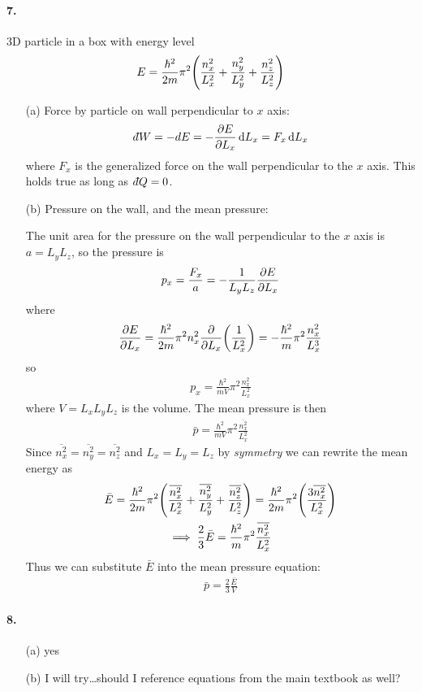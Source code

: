 \documentclass[../main.tex]{subfiles}
\begin{document}
\paragraph{7.} 3D particle in a box with energy level
\begin{align*}
    E = \frac{\hbar^2}{2m} \pi^2 \qt(\frac{n_x^2}{L_x^2} + \frac{n_y^2}{L_y^2} + \frac{n_z^2}{L_z^2})
\end{align*}
\begin{itemize}
    \item [(a)] Force by particle on wall perpendicular to $x$ axis:
    \begin{align*}
        d\hspace*{-0.08em}\bar{}\hspace*{0.1em} W = -dE = -\pdv{E}{L_x} \dd{L_x} = F_x \dd{L_x}
    \end{align*}
    where $F_x$ is the generalized force on the wall perpendicular to the $x$ axis. 
    This holds true as long as $d\hspace*{-0.08em}\bar{}\hspace*{0.1em} Q = 0$.
    \item [(b)] Pressure on the wall, and the mean pressure:
    
    The unit area for the pressure on the wall perpendicular to the $x$ axis is $a = L_y L_z$, so the pressure is
    \begin{align*}
        p_x = \frac{F_x}{a} = -\frac{1}{L_y L_z} \pdv{E}{L_x}
    \end{align*}
    where
    \begin{align*}
        \pdv{E}{L_x} = \frac{\hbar^2}{2m} \pi^2 n_x^2 \pdv{L_x}(\frac{1}{L_x^2}) = -\frac{\hbar^2}{m} \pi^2 \frac{n_x^2}{L_x^3}
    \end{align*}
    so 
    \begin{align*}
        p_x = \frac{\hbar^2}{mV} \pi^2 \frac{n_x^2}{L_x^2}
    \end{align*}
    where $V = L_x L_y L_z$ is the volume. The mean pressure is then 
    \begin{align*}
        \bar p = \frac{\hbar^2}{mV} \pi^2 \frac{\overline{n_x^2}}{L_x^2}
    \end{align*}
    Since $\overline{n_x^2} = \overline{n_y^2} = \overline{n_z^2}$ and $L_x = L_y = L_z$ by \textit{symmetry} we can rewrite the mean energy as 
    \begin{gather*}
        \bar E = \frac{\hbar^2}{2m} \pi^2 \qt(\frac{\overline{n_x^2}}{L_x^2} + \frac{\overline{n_y^2}}{L_y^2} + \frac{\overline{n_z^2}}{L_z^2}) = \frac{\hbar^2}{2m} \pi^2 \qt(\frac{3\overline{n_x^2}}{L_x^2}) \\
        \implies \frac{2}{3} \bar E = \frac{\hbar^2}{m} \pi^2 \frac{\overline{n_x^2}}{L_x^2}
    \end{gather*}
    Thus we can substitute $\bar E$ into the mean pressure equation:
    \begin{align*}
        \bar p = \frac{2}{3} \frac{\bar E}{V} 
    \end{align*}
\end{itemize}

\newpage
\paragraph{8.} 
\begin{itemize}
    \item [(a)] yes
    \item [(b)] I will try\dots should I reference equations from the main textbook as well?
\end{itemize}
\end{document}
